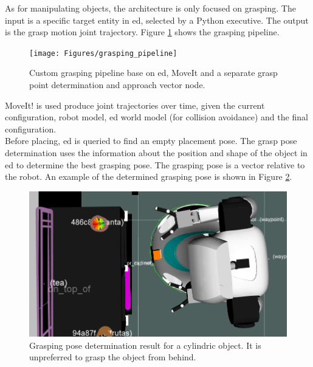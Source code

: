 As for manipulating objects, the architecture is only focused on grasping. The input is a specific target entity in \acrshort{ed}, selected by a Python executive. The output is the grasp motion joint trajectory.
Figure \ref{fig:grasping_pipeline} shows the grasping pipeline.
\begin{figure}[h]
    \centering
	\texttt{[image: Figures/grasping\_pipeline]}
	\caption{Custom grasping pipeline base on \acrshort{ed}, MoveIt and a separate grasp point determination and approach vector node.}
	\label{fig:grasping_pipeline}
\end{figure}
MoveIt! is used produce joint trajectories over time, given the current configuration, robot model, \acrshort{ed} world model (for collision avoidance) and the final configuration.
\\
Before placing, \acrshort{ed} is queried to find an empty placement pose.
The grasp pose determination uses the information about the position and shape of the object in \acrshort{ed} to determine the best grasping pose.
The grasping pose is a vector relative to the robot.
An example of the determined grasping pose is shown in Figure \ref{fig:grasping_pose_determination}.
\begin{figure}[H]
   \centering
   \includegraphics[width = 0.8\linewidth]{Figures/grasp_point_determination}
	\caption{Grasping pose determination result for a cylindric object. It is unpreferred to grasp the object from behind.}
	\label{fig:grasping_pose_determination}
\end{figure}
